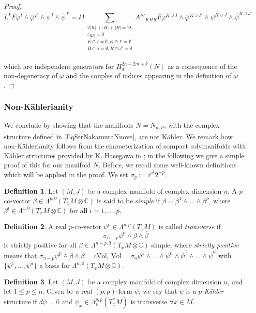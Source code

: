 \documentclass[a4paper, 11pt]{amsart}
\theoremstyle{plain}
\theoremstyle{definition}
\newtheorem{definizione}{Definition}[section]
\newcommand{\C}{\mathbb{C}}
\numberwithin{equation}{section}
\begin{document}
\begin{proof}
    \[L^{k}\bar F\varphi^{I} \wedge \bar\varphi^{I'} \wedge \psi^{J} \wedge \bar\psi^{J'} = k!\sum_{\substack{2|K| + |H| + |R| = 2k \\ c_{HR} = 0 \\ K \cap I = \emptyset, K \cap I' = \emptyset \\ H \cap J = \emptyset, R \cap J' = \emptyset}} A'''_{KHR} \bar F\varphi^{K \cup I} \wedge \bar\varphi^{K \cup I'} \wedge \psi^{H \cup J} \wedge \bar\psi^{R \cup J'}\]\\
    which are independent generators for $H^{2n+2m+k}_{d}(N)$ as a consequence of the non-degeneracy of $\omega$ and the couples of indices appearing in the definition of $\omega$.
\end{proof}

\subsubsection{Non-K\"ahlerianity} We conclude by showing that the manifolds $N = N_{\underline{\mu}, P}$, with the complex structure defined in \eqref{EqStrNakamuraNuove}, are not K\"ahler. We remark how non-K\"ahlerianity follows from the characterization of compact solvmanifolds with K\"ahler structures provided by K. Hasegawa in \cite{Hasegawa}; in the following we give a simple proof of this for our manifold $N$. Before, we recall some well-known definitions which will be applied in the proof. We set $\sigma_p := i^{p^2}2^{-p}$.
\begin{definizione}
    Let $(M,J)$ be a complex manifold of complex dimension $n$. A $p$-co-vector $\beta \in \Lambda^{p,0}(T_xM \otimes \C)$ is said to be \textit{simple} if $\beta = \beta^1 \wedge ... \wedge \beta^p$, where $\beta^i \in \Lambda^{1,0}(T_xM \otimes \C)$ for all $i=1, ..., p$.
\end{definizione}
\begin{definizione}
    A real $p$-co-vector $\psi^p \in \Lambda^{p,p}(T_xM)$ is called \textit{transverse} if 
    \[\sigma_{n-p}\psi^p \wedge \beta \wedge \bar\beta\]
    is strictly positive for all $\beta \in \Lambda^{n-p,0}(T_xM \otimes \C)$ simple, where \textit{strictly positive} means that $\sigma_{n-p}\psi^p \wedge \beta \wedge \bar\beta = c\text{Vol}$, $\text{Vol} = \sigma_n\psi^1 \wedge ... \wedge \psi^n \wedge \bar\psi^1 \wedge ... \wedge \bar\psi^n $ with $\{\psi^1, ..., \psi^n\}$ a basis for $\Lambda^{n,0}(T_xM \otimes \C)$. 
\end{definizione}
\begin{definizione}\label{pKahler}
    Let $(M,J)$ be a complex manifold of complex dimension $n$, and let $1 \leq p \leq n$. Given be a real $(p,p)$-form $\psi$, we say that $\psi$ is a $p$-{\em K\"ahler} structure if $d\psi = 0$ and $\psi_{x} \in \Lambda^{p,p}_{\mathbb{R}}(T_{x}^{\ast}M)$ is transverse $\forall x \in M$.
\end{definizione}
\end{document}
